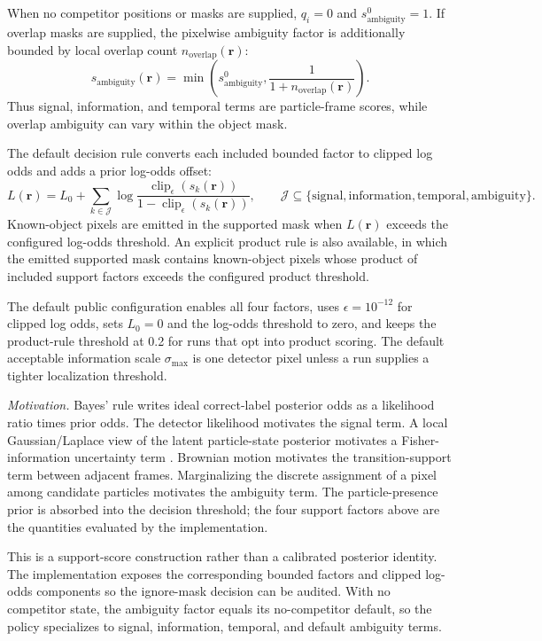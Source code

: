 When no competitor positions or masks are supplied, $q_i=0$ and $s_{\mathrm{ambiguity}}^{0}=1$. If overlap masks are supplied, the pixelwise ambiguity factor is additionally bounded by local overlap count $n_{\mathrm{overlap}}(\mathbf{r})$:
\begin{equation}
  s_{\mathrm{ambiguity}}(\mathbf{r})
  =
  \min\!\left(
  s_{\mathrm{ambiguity}}^{0},
  \frac{1}{1+n_{\mathrm{overlap}}(\mathbf{r})}
  \right).
\end{equation}
Thus signal, information, and temporal terms are particle-frame scores, while overlap ambiguity can vary within the object mask.

The default decision rule converts each included bounded factor to clipped log odds and adds a prior log-odds offset:
\begin{equation}
  L(\mathbf{r})
  =
  L_0
  +
  \sum_{k\in\mathcal{J}}
  \log
  \frac{\operatorname{clip}_{\epsilon}(s_k(\mathbf{r}))}
       {1-\operatorname{clip}_{\epsilon}(s_k(\mathbf{r}))},
  \qquad
  \mathcal{J}\subseteq
  \{\mathrm{signal},\mathrm{information},\mathrm{temporal},\mathrm{ambiguity}\}.
\end{equation}
Known-object pixels are emitted in the supported mask when $L(\mathbf{r})$ exceeds the configured log-odds threshold. An explicit product rule is also available, in which the emitted supported mask contains known-object pixels whose product of included support factors exceeds the configured product threshold.

The default public configuration enables all four factors, uses $\epsilon=10^{-12}$ for clipped log odds, sets $L_0=0$ and the log-odds threshold to zero, and keeps the product-rule threshold at 0.2 for runs that opt into product scoring. The default acceptable information scale $\sigma_{\max}$ is one detector pixel unless a run supplies a tighter localization threshold.

\emph{Motivation.} Bayes' rule writes ideal correct-label posterior odds as a likelihood ratio times prior odds. The detector likelihood motivates the signal term. A local Gaussian/Laplace view of the latent particle-state posterior motivates a Fisher-information uncertainty term \cite{bishop-prml}. Brownian motion motivates the transition-support term between adjacent frames. Marginalizing the discrete assignment of a pixel among candidate particles motivates the ambiguity term. The particle-presence prior is absorbed into the decision threshold; the four support factors above are the quantities evaluated by the implementation.

This is a support-score construction rather than a calibrated posterior identity. The implementation exposes the corresponding bounded factors and clipped log-odds components so the ignore-mask decision can be audited. With no competitor state, the ambiguity factor equals its no-competitor default, so the policy specializes to signal, information, temporal, and default ambiguity terms.
